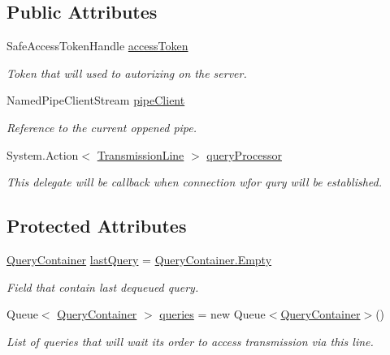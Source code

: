 \subsection*{Public Attributes}
\begin{DoxyCompactItemize}
\item 
Safe\+Access\+Token\+Handle \mbox{\hyperlink{class_pipes_provider_1_1_client_1_1_transmission_line_adad9bc543ae01a23e792f46bf3b3092f}{access\+Token}}
\begin{DoxyCompactList}\small\item\em Token that will used to autorizing on the server. \end{DoxyCompactList}\item 
Named\+Pipe\+Client\+Stream \mbox{\hyperlink{class_pipes_provider_1_1_client_1_1_transmission_line_a617db258fff1a28c80ff7d6241e8372e}{pipe\+Client}}
\begin{DoxyCompactList}\small\item\em Reference to the current oppened pipe. \end{DoxyCompactList}\item 
System.\+Action$<$ \mbox{\hyperlink{class_pipes_provider_1_1_client_1_1_transmission_line}{Transmission\+Line}} $>$ \mbox{\hyperlink{class_pipes_provider_1_1_client_1_1_transmission_line_a86f49118056ad8cb6fe383abb2a350e8}{query\+Processor}}
\begin{DoxyCompactList}\small\item\em This delegate will be callback when connection wfor qury will be established. \end{DoxyCompactList}\end{DoxyCompactItemize}
\subsection*{Protected Attributes}
\begin{DoxyCompactItemize}
\item 
\mbox{\hyperlink{struct_pipes_provider_1_1_client_1_1_query_container}{Query\+Container}} \mbox{\hyperlink{class_pipes_provider_1_1_client_1_1_transmission_line_ac58ee721ec6876da25190b15d52530a3}{last\+Query}} = \mbox{\hyperlink{struct_pipes_provider_1_1_client_1_1_query_container_a0e1f91d0a990824b56170c3da5e5919c}{Query\+Container.\+Empty}}
\begin{DoxyCompactList}\small\item\em Field that contain last dequeued query. \end{DoxyCompactList}\item 
Queue$<$ \mbox{\hyperlink{struct_pipes_provider_1_1_client_1_1_query_container}{Query\+Container}} $>$ \mbox{\hyperlink{class_pipes_provider_1_1_client_1_1_transmission_line_af110134a03e1e046911970fff4774600}{queries}} = new Queue$<$\mbox{\hyperlink{struct_pipes_provider_1_1_client_1_1_query_container}{Query\+Container}}$>$()
\begin{DoxyCompactList}\small\item\em List of queries that will wait its order to access transmission via this line. \end{DoxyCompactList}\end{DoxyCompactItemize}
